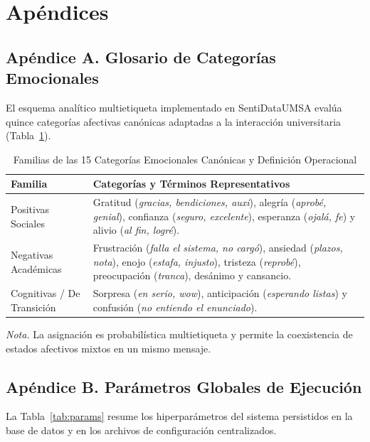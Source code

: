 \section{Apéndices}
\label{sec:apendice}

\subsection{Apéndice A. Glosario de Categorías Emocionales}

El esquema analítico multietiqueta implementado en SentiDataUMSA evalúa quince categorías afectivas canónicas adaptadas a la interacción universitaria (Tabla~\ref{tab:glosario}).

\begin{table}[htbp]
  \centering
  \small
  \caption{Familias de las 15 Categorías Emocionales Canónicas y Definición Operacional}
  \label{tab:glosario}
  \begin{tabular}{lp{9.5cm}}
    \toprule
    Familia & Categorías y Términos Representativos \\
    \midrule
    Positivas Sociales & Gratitud (\emph{gracias, bendiciones, auxi}), alegría (\emph{aprobé, genial}), confianza (\emph{seguro, excelente}), esperanza (\emph{ojalá, fe}) y alivio (\emph{al fin, logré}). \\
    Negativas Académicas& Frustración (\emph{falla el sistema, no cargó}), ansiedad (\emph{plazos, nota}), enojo (\emph{estafa, injusto}), tristeza (\emph{reprobé}), preocupación (\emph{tranca}), desánimo y cansancio. \\
    Cognitivas / De Transición & Sorpresa (\emph{en serio, wow}), anticipación (\emph{esperando listas}) y confusión (\emph{no entiendo el enunciado}). \\
    \bottomrule
  \end{tabular}
  \vspace{4pt}
  \begin{minipage}{0.92\textwidth}
    \footnotesize
    \textit{Nota.} La asignación es probabilística multietiqueta y permite la coexistencia de estados afectivos mixtos en un mismo mensaje.
  \end{minipage}
\end{table}

\subsection{Apéndice B. Parámetros Globales de Ejecución}

La Tabla~\ref{tab:params} resume los hiperparámetros del sistema persistidos en la base de datos y en los archivos de configuración centralizados.

